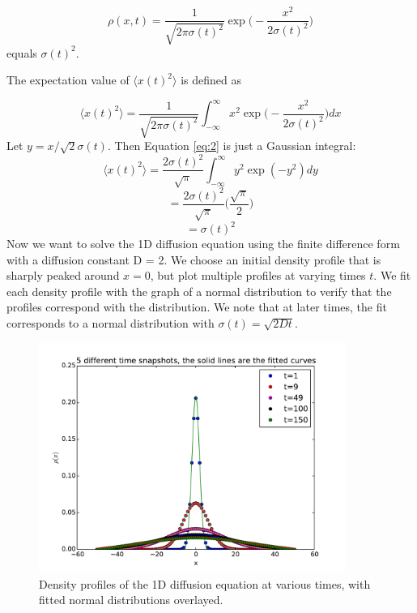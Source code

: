 \documentclass{article}
\begin{document}
\begin{equation}
\rho(x,t) = \frac{1}{\sqrt{2\pi\sigma(t)^{2}}} \exp \bigg(-\frac{x^{2}}{2\sigma(t)^{2}}\bigg)
\end{equation}
equals $\sigma(t)^{2}$.\par
\noindent The expectation value of $\langle x(t)^{2} \rangle$ is defined as

\begin{equation}
\langle x(t)^{2} \rangle = \frac{1}{\sqrt{2\pi\sigma(t)^{2}}} \int_{-\infty}^{\infty} x^{2} \exp \bigg(-\frac{x^{2}}{2\sigma(t)^{2}}\bigg) dx
\label{eq:2}
\end{equation}
Let $y = x/\sqrt{2}\sigma(t)$. Then Equation \ref{eq:2} is just a Gaussian integral:
\begin{equation}
\langle x(t)^{2} \rangle = \frac{2\sigma(t)^2}{\sqrt{\pi}} \int_{-\infty}^{\infty} y^{2} \exp(-y^{2}) dy
\end{equation}
\begin{equation}
= \frac{2\sigma(t)^2}{\sqrt{\pi}} \bigg(\frac{\sqrt{\pi}}{2}\bigg)
\end{equation}
\begin{equation}
= \sigma(t)^{2}
\end{equation}
Now we want to solve the 1D diffusion equation using the finite difference form with a diffusion constant D = 2. We choose an initial density profile that is sharply peaked around $x = 0$, but plot multiple profiles at varying times $t$. We fit each density profile with the graph of a normal distribution to verify that the profiles correspond with the distribution. We note that at later times, the fit corresponds to a normal distribution with $\sigma(t) = \sqrt{2Dt}$.\par
\begin{figure}[H]
\centering
\captionsetup{justification=centering, margin=3.5cm}
\includegraphics[width=10cm]{figures/snapshots.pdf}
\caption{Density profiles of the 1D diffusion equation at various times, with fitted normal distributions overlayed.}
\end{figure}
\end{document}
